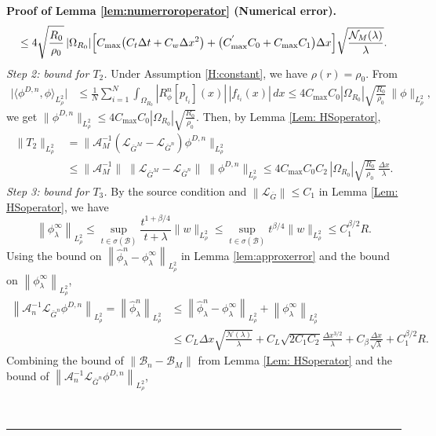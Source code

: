\documentclass[12pt]{article}
\def\Gbar{ {\overline{G}} }
\newenvironment{proof}[1][Proof]{\noindent\textbf{#1.} }{\ \rule{0.5em}{0.5em}}
\numberwithin{equation}{section}
\numberwithin{theorem}{section}
\begin{document}
\begin{proof}[Proof of Lemma \ref{lem:numerroroperator} (Numerical error)]
$$\le 4 \sqrt{\frac{R_0}{\rho_{0}}}\,
|\Omega_{R_0}|\Bigl[
C_{\max}\bigl(C_t \Delta t+C_w \Delta x^2\bigr)  
+ \bigl( C_{\max }^{'} C_0 +  C_{\max } C_1\bigr)\Delta x
\Bigr]\sqrt{\frac{\mathcal{N}_M(\lambda)}{\lambda}}.
$$
\emph{Step 2: bound for $T_2$.} Under Assumption \ref{H:constant}, we have $\rho(r) =\rho_0$. From
$$
\begin{aligned}
\bigl|\langle \phi^{D,n},\phi\rangle_{L^2_\rho}\bigr|
&\le \frac{1}{N}\sum_{i=1}^N\int_{\Omega_{R_0}}
|R_\phi^n[p_{t_i}](x)|\,|f_{t_i}(x)|\,dx \le  4 C_{\max }  C_0  |\Omega_{R_0}|\sqrt{\frac{R_0}{\rho_{0}}}\,\|\phi\|_{L^2_\rho},
\end{aligned}
$$
we get $\|\phi^{D,n}\|_{L^2_\rho}
\le 4 C_{\max }  C_0 |\Omega_{R_0}| \sqrt{\frac{R_0}{\rho_{0}}}.$ Then, by Lemma \ref{Lem: HSoperator},
$$
\begin{aligned}
\|T_2\|_{L^2_\rho}
&= \|\mathcal{A}_M^{-1}(\mathcal{L}_{\bar{G}^M}-\mathcal{L}_{\bar{G}^n})\phi^{D,n}\|_{L^2_\rho} \\
&\le \|\mathcal{A}_M^{-1}\|\;\|\mathcal{L}_{\bar{G}^M}-\mathcal{L}_{\bar{G}^n}\|\;
     \|\phi^{D,n}\|_{L^2_\rho} 
\le 4 C_{\max }  C_0 C_2\,|\Omega_{R_0}| \sqrt{\frac{R_0}{\rho_{0}}}\,
   \frac{\Delta x}{\lambda}.
\end{aligned}
$$
\medskip\noindent
\emph{Step 3: bound for $T_3$.} By the source condition and $\left\|\mathcal{L}_{\Gbar}\right\| \leq C_1 $ in Lemma \ref{Lem: HSoperator}, we have 
$$
\left\|{\phi}_\lambda^{\infty}\right\|_{L_\rho^2} \leq \sup _{t \in \sigma(\mathcal{B})} \frac{t^{1 + \beta / 4}}{t+\lambda}\|w\|_{L_\rho^2} \leq \sup _{t \in \sigma(\mathcal{B})} t^{\beta / 4}\|w\|_{L_\rho^2} \leq C_1^{\beta/2}R. 
$$
Using the bound on $\left\|\hat{\phi}_\lambda^n-\phi_\lambda^{\infty}\right\|_{L_\rho^2}$ in Lemma \ref{lem:approxerror} and the bound on $\left\|\phi_\lambda^{\infty}\right\|_{L_\rho^2}$,
$$
\begin{aligned}
\left\|\mathcal{A}_n^{-1} \mathcal{L}_{\bar{G}^n} \phi^{D, n}\right\|_{L_\rho^2}=\left\|\hat{\phi}_\lambda^n\right\|_{L_\rho^2} & \leq\left\|\hat{\phi}_\lambda^n-\phi_\lambda^{\infty}\right\|_{L_\rho^2}+\left\|\phi_\lambda^{\infty}\right\|_{L_\rho^2} \\
& \leq C_L \Delta x \sqrt{\frac{\mathcal{N}(\lambda)}{\lambda}}+C_L \sqrt{2 C_1 C_2} \frac{\Delta x^{3 / 2}}{\lambda}+C_\beta \frac{\Delta x}{\sqrt{\lambda}}+C_1^{\beta / 2} R .
\end{aligned}
$$
Combining the bound of $\|\mathcal{B}_n-\mathcal{B}_M\|$ from Lemma \ref{Lem: HSoperator} and the bound of $\left\|\mathcal{A}_n^{-1} \mathcal{L}_{\bar{G}^n} \phi^{D, n}\right\|_{L_\rho^2}$, 

\end{proof}
\end{document}
